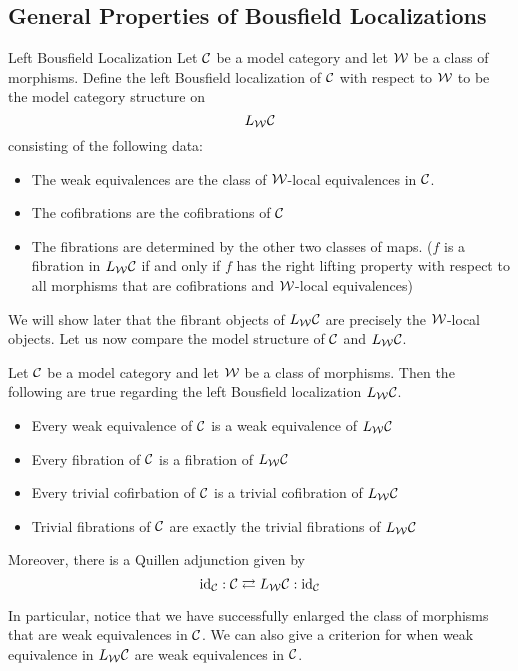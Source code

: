 \documentclass[a4paper]{article}
\begin{document}
\subsection{General Properties of Bousfield Localizations}
\begin{defn}{Left Bousfield Localization}{} Let $\mathcal{C}$ be a model category and let $\mathcal{W}$ be a class of morphisms. Define the left Bousfield localization of $\mathcal{C}$ with respect to $\mathcal{W}$ to be the model category structure on $$L_{\mathcal{W}}\mathcal{C}$$ consisting of the following data: 
\begin{itemize}
\item The weak equivalences are the class of $\mathcal{W}$-local equivalences in $\mathcal{C}$. 
\item The cofibrations are the cofibrations of $\mathcal{C}$
\item The fibrations are determined by the other two classes of maps. ($f$ is a fibration in $L_{\mathcal{W}}\mathcal{C}$ if and only if $f$ has the right lifting property with respect to all morphisms that are cofibrations and $\mathcal{W}$-local equivalences)
\end{itemize}
\end{defn}

We will show later that the fibrant objects of $L_{\mathcal{W}}\mathcal{C}$ are precisely the $\mathcal{W}$-local objects. Let us now compare the model structure of $\mathcal{C}$ and $L_{\mathcal{W}}\mathcal{C}$. 

\begin{thm}{}{} Let $\mathcal{C}$ be a model category and let $\mathcal{W}$ be a class of morphisms. Then the following are true regarding the left Bousfield localization $L_{\mathcal{W}}\mathcal{C}$. 
\begin{itemize}
\item Every weak equivalence of $\mathcal{C}$ is a weak equivalence of $L_{\mathcal{W}}\mathcal{C}$
\item Every fibration of $\mathcal{C}$ is a fibration of $L_{\mathcal{W}}\mathcal{C}$
\item Every trivial cofirbation of $\mathcal{C}$ is a trivial cofibration of $L_{\mathcal{W}}\mathcal{C}$
\item Trivial fibrations of $\mathcal{C}$ are exactly the trivial fibrations of $L_{\mathcal{W}}\mathcal{C}$
\end{itemize}
Moreover, there is a Quillen adjunction given by $$\text{id}_{\mathcal{C}}:\mathcal{C}\rightleftarrows L_{\mathcal{W}}\mathcal{C}:\text{id}_{\mathcal{C}}$$
\end{thm}

In particular, notice that we have successfully enlarged the class of morphisms that are weak equivalences in $\mathcal{C}$. We can also give a criterion for when weak equivalence in $L_{\mathcal{W}}\mathcal{C}$ are weak equivalences in $\mathcal{C}$. 
\end{document}
